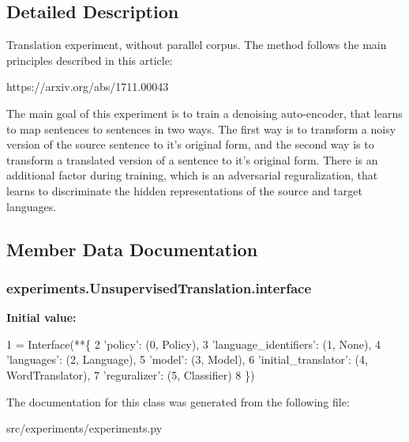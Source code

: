 \subsection{Detailed Description}
\begin{DoxyVerb}Translation experiment, without parallel corpus. The method follows the main principles described
in this article:

    https://arxiv.org/abs/1711.00043

The main goal of this experiment is to train a denoising auto-encoder, that learns to map sentences to
sentences in two ways. The first way is to transform a noisy version of the source sentence to it's
original form, and the second way is to transform a translated version of a sentence to it's original form.
There is an additional factor during training, which is an adversarial reguralization, that learns to
discriminate the hidden representations of the source and target languages.
\end{DoxyVerb}
 

\subsection{Member Data Documentation}
\subsubsection[{\texorpdfstring{interface}{interface}}]{\setlength{\rightskip}{0pt plus 5cm}experiments.\+Unsupervised\+Translation.\+interface\hspace{0.3cm}{\ttfamily [static]}}\hypertarget{classexperiments_1_1UnsupervisedTranslation_a9eb273dbcdf5d811b88187c53808d708}{}\label{classexperiments_1_1UnsupervisedTranslation_a9eb273dbcdf5d811b88187c53808d708}
{\bfseries Initial value\+:}
\begin{DoxyCode}
1 = Interface(**\{
2         \textcolor{stringliteral}{'policy'}:               (0, Policy),
3         \textcolor{stringliteral}{'language\_identifiers'}: (1, \textcolor{keywordtype}{None}),
4         \textcolor{stringliteral}{'languages'}:            (2, Language),
5         \textcolor{stringliteral}{'model'}:                (3, Model),
6         \textcolor{stringliteral}{'initial\_translator'}:   (4, WordTranslator),
7         \textcolor{stringliteral}{'reguralizer'}:          (5, Classifier)
8     \})
\end{DoxyCode}


The documentation for this class was generated from the following file\+:\begin{DoxyCompactItemize}
\item 
src/experiments/experiments.\+py\end{DoxyCompactItemize}
